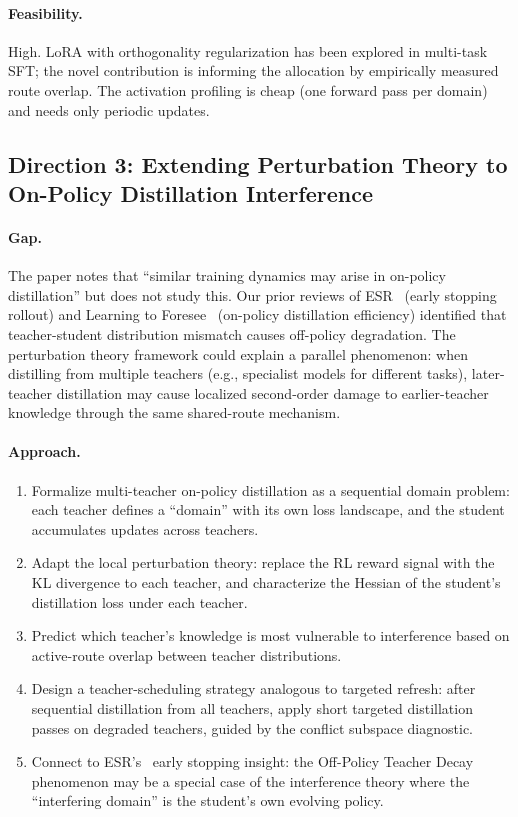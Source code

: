 \documentclass[11pt,a4paper]{article}
\begin{document}
\paragraph{Feasibility.} High. LoRA with orthogonality regularization has been explored in multi-task SFT; the novel contribution is informing the allocation by empirically measured route overlap. The activation profiling is cheap (one forward pass per domain) and needs only periodic updates.

\subsection{Direction 3: Extending Perturbation Theory to On-Policy Distillation Interference}

\paragraph{Gap.} The paper notes that ``similar training dynamics may arise in on-policy distillation'' but does not study this. Our prior reviews of ESR~\cite{esr2026} (early stopping rollout) and Learning to Foresee~\cite{foresee2026} (on-policy distillation efficiency) identified that teacher-student distribution mismatch causes off-policy degradation. The perturbation theory framework could explain a parallel phenomenon: when distilling from multiple teachers (e.g., specialist models for different tasks), later-teacher distillation may cause localized second-order damage to earlier-teacher knowledge through the same shared-route mechanism.

\paragraph{Approach.}
\begin{enumerate}
\item Formalize multi-teacher on-policy distillation as a sequential domain problem: each teacher defines a ``domain'' with its own loss landscape, and the student accumulates updates across teachers.
\item Adapt the local perturbation theory: replace the RL reward signal with the KL divergence to each teacher, and characterize the Hessian of the student's distillation loss under each teacher.
\item Predict which teacher's knowledge is most vulnerable to interference based on active-route overlap between teacher distributions.
\item Design a teacher-scheduling strategy analogous to targeted refresh: after sequential distillation from all teachers, apply short targeted distillation passes on degraded teachers, guided by the conflict subspace diagnostic.
\item Connect to ESR's~\cite{esr2026} early stopping insight: the Off-Policy Teacher Decay phenomenon may be a special case of the interference theory where the ``interfering domain'' is the student's own evolving policy.
\end{enumerate}
\end{document}
